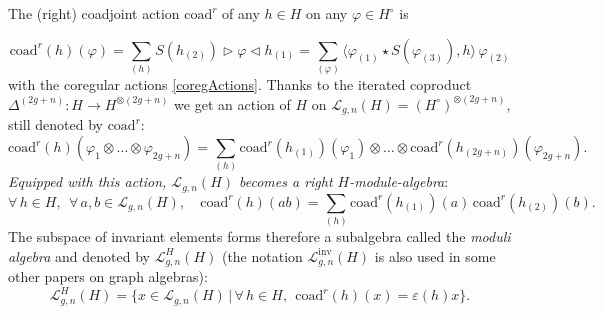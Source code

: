 \documentclass[11pt]{amsart}
\newcommand{\Ll}{\mathcal{L}}
\begin{document}
\indent The (right) coadjoint action $\mathrm{coad}^r$ of any $h \in H$ on any $\varphi \in H^{\circ}$ is

\begin{equation}\label{defCoad}
\mathrm{coad}^r(h)(\varphi) = \sum_{(h)} S(h_{(2)}) \rhd \varphi \lhd h_{(1)} = \sum_{(\varphi)}\bigl\langle \varphi_{(1)} \star S(\varphi_{(3)}),h \bigr\rangle \,  \varphi_{(2)}
\end{equation}
with the coregular actions \eqref{coregActions}. Thanks to the iterated coproduct $\Delta^{(2g+n)} : H \to H^{\otimes (2g+n)}$ we get an action of $H$ on $\mathcal{L}_{g,n}(H) = (H^\circ)^{\otimes (2g+n)}$, still denoted by $\mathrm{coad}^r$:
\begin{equation}\label{coadLgn}
\mathrm{coad}^r(h)(\varphi_1 \otimes \ldots \otimes \varphi_{2g+n}) = \sum_{(h)} \mathrm{coad}^r(h_{(1)})(\varphi_1) \otimes \ldots \otimes \mathrm{coad}^r(h_{(2g+n)})(\varphi_{2g+n}).
\end{equation}
{\em Equipped with this action, $\mathcal{L}_{g,n}(H)$ becomes a right $H$-module-algebra}:
\[ \forall \, h \in H, \:\: \forall \, a,b \in \mathcal{L}_{g,n}(H), \quad \mathrm{coad}^r(h)(ab) = \sum_{(h)} \mathrm{coad}^r(h_{(1)})(a)\,\mathrm{coad}^r(h_{(2)})(b). \]
The subspace of invariant elements forms therefore a subalgebra called the {\em moduli algebra} and denoted by $\Ll^H_{g,n}(H)$ (the notation $\Ll_{g,n}^{\mathrm{inv}}(H)$ is also used in some other papers on graph algebras):
\begin{equation}\label{moduliAlgH}
\Ll^H_{g,n}(H) = \bigl\{ x \in \mathcal{L}_{g,n}(H) \,\big| \, \forall \, h \in H, \:\: \mathrm{coad}^r(h)(x) = \varepsilon(h)x \bigr\}.
\end{equation}
\end{document}
